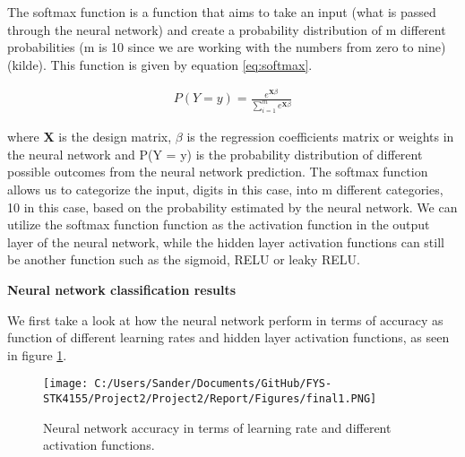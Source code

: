 \documentclass[12pt,a4paper]{article}
\begin{document}
\noindent The softmax function is a function that aims to take an input (what is passed through the neural network) and create a probability distribution of m different probabilities (m is 10 since we are working with the numbers from zero to nine) (kilde). This function is given by equation \ref{eq:softmax}.

\begin{equation}\label{eq:softmax}
\begin{aligned}
P(Y = y) = \frac{e^{\textbf{X}\beta}}{\sum_{i = 1}^m e^{\textbf{X}\beta}} 
\end{aligned}
\end{equation}

\noindent where \textbf{X} is the design matrix, $\beta$ is the regression coefficients matrix or weights in the neural network and P(Y = y) is the probability distribution of different possible outcomes from the neural network prediction. The softmax function allows us to categorize the input, digits in this case, into m different categories, 10 in this case, based on the probability estimated by the neural network. We can utilize the softmax function function as the activation function in the output layer of the neural network, while the hidden layer activation functions can still be another function such as the sigmoid, RELU or leaky RELU. 

\begin{center}
\large{\textbf{Neural network classification results}}
\end{center}

\noindent We first take a look at how the neural network perform in terms of accuracy as function of different learning rates and hidden layer activation functions, as seen in figure \ref{fig:AccvsLrate}.

\begin{figure}[H]
\centering
\texttt{[image: C:/Users/Sander/Documents/GitHub/FYS-STK4155/Project2/Project2/Report/Figures/final1.PNG]}
\caption{\label{fig:AccvsLrate} Neural network accuracy in terms of learning rate and different activation functions.}
\end{figure}
\end{document}
